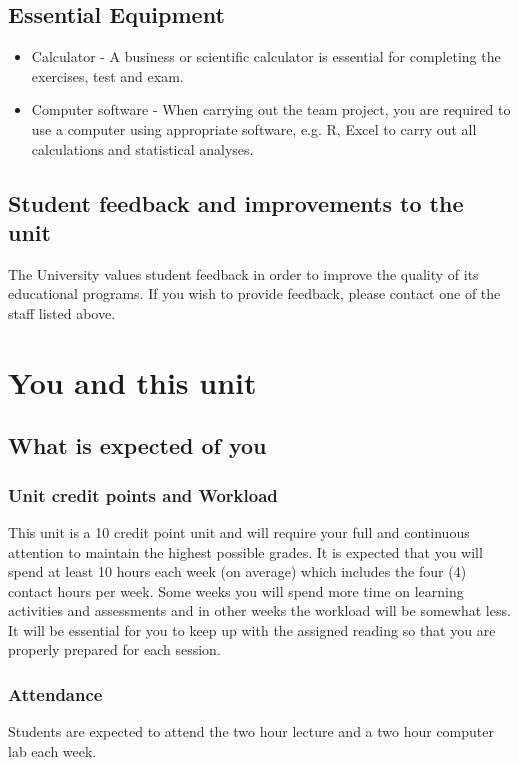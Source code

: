 \documentclass[a4paper,oneside]{book}
\begin{document}
\section{Essential Equipment}

\begin{itemize}
\item Calculator - A business or scientific calculator is essential
  for completing the exercises, test and exam.
\item Computer software - When carrying out the team project, you are
  required to use a computer using appropriate software, e.g. R, Excel to
  carry out all calculations and statistical analyses.
\end{itemize}
  
\section{Student feedback and improvements to the unit}

The University values student feedback in order to improve the quality
of its educational programs. If you wish to provide feedback, please
contact one of the staff listed above.


\chapter{You and this unit}

\section{What is expected of you}


\subsection*{Unit credit points and Workload}
This unit is a 10 credit point unit and will require your full and
continuous attention to maintain the highest possible grades.  It is
expected that you will spend at least 10 hours each week (on average)
which includes the four (4) contact hours per week.  Some weeks you
will spend more time on learning activities and assessments and in
other weeks the workload will be somewhat less.  It will be essential
for you to keep up with the assigned reading so that you are properly
prepared for each session.

\subsection*{Attendance}
Students are expected to attend the two hour lecture and a two
hour computer lab each week.
\end{document}
